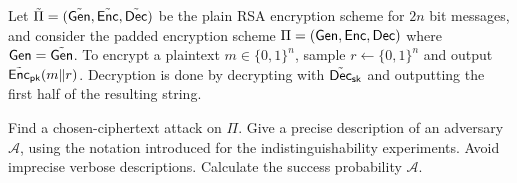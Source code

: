 \documentclass[a4paper,10pt,landscape,twocolumn]{scrartcl}
\begin{document}
\begin{exercise}
	Let $\tilde \Pi=(\tilde{\mathsf{Gen}}, \tilde {\mathsf{Enc}}, \tilde {\mathsf{Dec}})$ be the plain RSA encryption scheme for $2 n$ bit messages, and consider the
	padded encryption scheme $\Pi=(\mathsf{Gen}, \mathsf{Enc}, \mathsf{Dec})$ where $\mathsf{Gen}=\tilde{\mathsf{Gen}}$. To encrypt a plaintext $m\in\{0,1\}^n$, sample $r\gets\{0,1\}^n$ and output $\tilde {\mathsf{Enc}}_{\mathsf{pk}}(m\|r)$. Decryption is done by decrypting with $\tilde{\mathsf{Dec}}_{\mathsf{sk}}$ and outputting the first half of the resulting string.
	\begin{subex}
		Find a chosen-ciphertext attack on $\Pi$. Give a precise description of an adversary $\mathcal A$, using the notation introduced for the indistinguishability experiments. Avoid imprecise verbose descriptions. Calculate the success probability $\mathcal A$.
	\end{subex}
\end{exercise}
\end{document}
